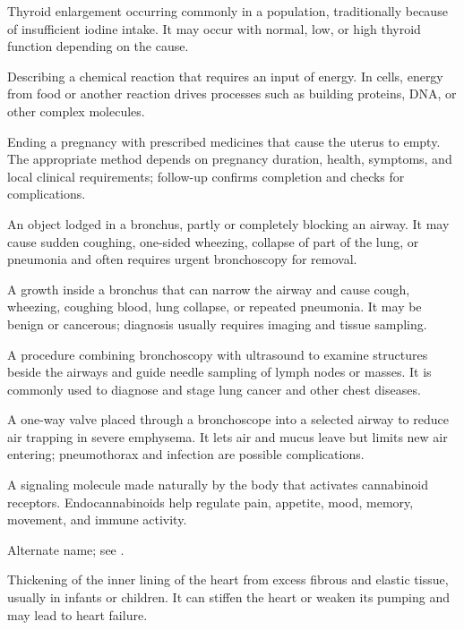  Thyroid enlargement occurring commonly in a population, traditionally because of insufficient iodine intake. It may occur with normal, low, or high thyroid function depending on the cause.

 Describing a chemical reaction that requires an input of energy. In cells, energy from food or another reaction drives processes such as building proteins, DNA, or other complex molecules.

 Ending a pregnancy with prescribed medicines that cause the uterus to empty. The appropriate method depends on pregnancy duration, health, symptoms, and local clinical requirements; follow-up confirms completion and checks for complications.

 An object lodged in a bronchus, partly or completely blocking an airway. It may cause sudden coughing, one-sided wheezing, collapse of part of the lung, or pneumonia and often requires urgent bronchoscopy for removal.

 A growth inside a bronchus that can narrow the airway and cause cough, wheezing, coughing blood, lung collapse, or repeated pneumonia. It may be benign or cancerous; diagnosis usually requires imaging and tissue sampling.

 A procedure combining bronchoscopy with ultrasound to examine structures beside the airways and guide needle sampling of lymph nodes or masses. It is commonly used to diagnose and stage lung cancer and other chest diseases.

 A one-way valve placed through a bronchoscope into a selected airway to reduce air trapping in severe emphysema. It lets air and mucus leave but limits new air entering; pneumothorax and infection are possible complications.

 A signaling molecule made naturally by the body that activates cannabinoid receptors. Endocannabinoids help regulate pain, appetite, mood, memory, movement, and immune activity.

 Alternate name; see .

 Thickening of the inner lining of the heart from excess fibrous and elastic tissue, usually in infants or children. It can stiffen the heart or weaken its pumping and may lead to heart failure.


